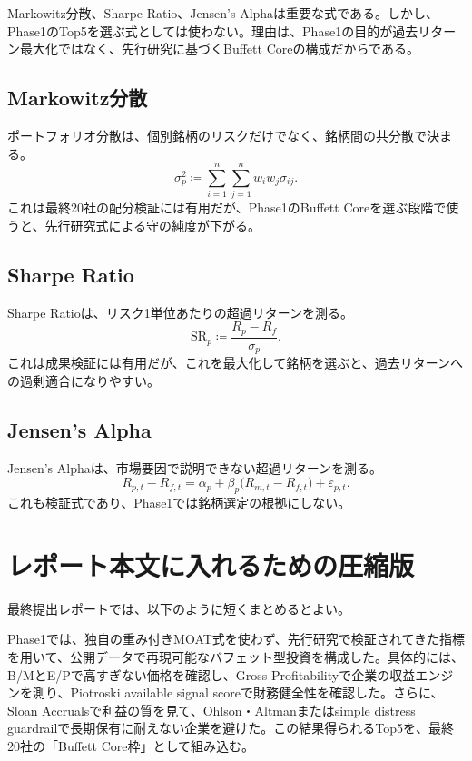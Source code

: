 \documentclass[11pt,a4paper]{article}
\begin{document}
Markowitz分散、Sharpe Ratio、Jensen's Alphaは重要な式である。しかし、Phase1のTop5を選ぶ式としては使わない。理由は、Phase1の目的が過去リターン最大化ではなく、先行研究に基づくBuffett Coreの構成だからである。

\subsection{Markowitz分散}

ポートフォリオ分散は、個別銘柄のリスクだけでなく、銘柄間の共分散で決まる。
\begin{equation}
\sigma_p^2 \coloneqq \sum_{i=1}^{n}\sum_{j=1}^{n} w_iw_j\sigma_{ij}.
\label{eq:markowitz}
\end{equation}
これは最終20社の配分検証には有用だが、Phase1のBuffett Coreを選ぶ段階で使うと、先行研究式による守の純度が下がる。

\subsection{Sharpe Ratio}

Sharpe Ratioは、リスク1単位あたりの超過リターンを測る。
\begin{equation}
\mathrm{SR}_p \coloneqq \frac{R_p-R_f}{\sigma_p}.
\label{eq:sharpe}
\end{equation}
これは成果検証には有用だが、これを最大化して銘柄を選ぶと、過去リターンへの過剰適合になりやすい。

\subsection{Jensen's Alpha}

Jensen's Alphaは、市場要因で説明できない超過リターンを測る。
\begin{equation}
R_{p,t}-R_{f,t}=\alpha_p+\beta_p\bigl(R_{m,t}-R_{f,t}\bigr)+\varepsilon_{p,t}.
\label{eq:jensen}
\end{equation}
これも検証式であり、Phase1では銘柄選定の根拠にしない。

\clearpage
\section{レポート本文に入れるための圧縮版}

最終提出レポートでは、以下のように短くまとめるとよい。

\begin{keybox}[本文用要約案]
Phase1では、独自の重み付きMOAT式を使わず、先行研究で検証されてきた指標を用いて、公開データで再現可能なバフェット型投資を構成した。具体的には、B/MとE/Pで高すぎない価格を確認し、Gross Profitabilityで企業の収益エンジンを測り、Piotroski available signal scoreで財務健全性を確認した。さらに、Sloan Accrualsで利益の質を見て、Ohlson・Altmanまたはsimple distress guardrailで長期保有に耐えない企業を避けた。この結果得られるTop5を、最終20社の「Buffett Core枠」として組み込む。
\end{keybox}
\end{document}

